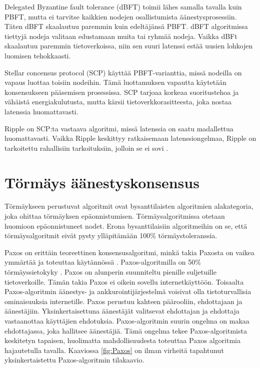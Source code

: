 \documentclass[utf8,bachelor]{gradu3}
\begin{document}
Delegated Byzantine fault tolerance (dBFT) toimii lähes samalla tavalla kuin PBFT, mutta ei tarvitse kaikkien nodejen osallistumista äänestysprosessiin. Täten dBFT skaalautuu paremmin kuin edeltäjänsä PBFT.
dBFT algoritmissa tiettyjä nodeja valitaan edustamaan muita tai ryhmää nodeja.
Vaikka dBFt skaalautuu paremmin tietoverkoissa, niin sen suuri latenssi estää uusien lohkojen luomisen tehokkaasti.

Stellar concensus protocol (SCP) käyttää PBFT-varianttia, missä nodeilla on vapaus luottaa toisiin nodeihin. Tämä luottamuksen vapautta käytetään konsensukseen pääsemisen prosessissa.
SCP tarjoaa korkeaa suoritustehoa ja vähäistä energiakulutusta, mutta kärsii tietoverkkorasitteesta, joka nostaa latenssia huomattavasti. 

Ripple on SCP:ta vastaava algoritmi, missä latenssia on saatu madallettua huomattavasti. Vaikka Ripple keskittyy ratkaisemaan latenssiongelmaa, Ripple on tarkoitettu rahallisiin tarkoituksiin, jolloin se ei sovi .

\section{Törmäys äänestyskonsensus}

Törmäykseen perustuvat algoritmit ovat bysanttilaisten algoritmien alakategoria, joka ohittaa törmäyksen epäonnistumisen. Törmäysalgoritmissa otetaan huomioon epäonnistuneet nodet. Erona bysanttilaisiin algoritmeihin on se, että törmäysalgoritmit eivät pysty ylläpitämään 100\% törmäystoleranssia.

Paxos on erittäin teoreettinen konsensusalgoritmi, minkä takia Paxosta on vaikea ymmärtää ja toteuttaa käytännössä \parencite{andrey2019review}.
Paxos-algoritmilla on 50\% törmäyssietokyky \parencite{panda2019study}.
Paxos on alunperin suunniteltu pienille suljetuille tietoverkoille. Tämän takia Paxos ei oikein sovellu internetkäyttöön.
Toisaalta Paxos-algoritmin äänestys- ja ankkurointijärjestelmä voisivat olla tietoturvallisia ominaisuuksia internetille. 
Paxos perustuu kahteen päärooliin, ehdottajaan ja äänestäjiin. Yksinkertaisettuna äänestäjät valitsevat ehdottajan ja ehdottaja vastaanottaa käyttäjien ehdotuksia.
Paxos-algoritmin suurin ongelma on makaa ehdottajassa, joka hallitsee äänestäjiä. Tämä ongelma tekee Paxos-algoritmista keskitetyn tapaisen, huolimatta mahdollisuudesta toteuttaa Paxos algoritmia hajautetulla tavalla. Kaaviossa \ref{fig:Paxos} on ilman virheitä tapahtunut yksinkertaistettu Paxos-algoritmin tilakaavio.
\end{document}
